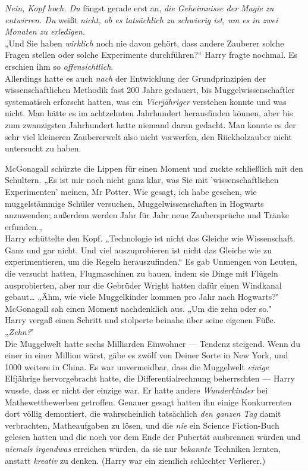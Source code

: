 {\emph{Nein, Kopf hoch. Du} fängst gerade erst an, \emph{die Geheimnisse der Magie zu entwirren. Du} weißt \emph{nicht, ob es tatsächlich zu schwierig ist, um es in zwei Monaten zu erledigen.}\\ „Und Sie haben \emph{wirklich} noch nie davon gehört, dass andere Zauberer solche Fragen stellen oder solche Experimente durchführen?“ Harry fragte nochmal. Es erschien ihm so \emph{offensichtlich}.\\ Allerdings hatte es auch \emph{nach} der Entwicklung der Grundprinzipien der wissenschaftlichen Methodik fast 200 Jahre gedauert, bis Muggelwissenschaftler systematisch erforscht hatten, was ein \emph{Vierjähriger} verstehen konnte und was nicht. Man hätte es im achtzehnten Jahrhundert herausfinden können, aber bis zum zwanzigsten Jahrhundert hatte niemand daran gedacht. Man konnte es der sehr viel kleineren Zaubererwelt also nicht vorwerfen, den Rückholzauber nicht untersucht zu haben.

McGonagall schürzte die Lippen für einen Moment und zuckte schließlich mit den Schultern. „Es ist mir noch nicht ganz klar, was Sie mit 'wissenschaftlichen Experimenten' meinen, Mr Potter. Wie gesagt, ich habe gesehen, wie muggelstämmige Schüler versuchen, Muggelwissenschaften in Hogwarts anzuwenden; außerdem werden Jahr für Jahr neue Zaubersprüche und Tränke erfunden.„\\ Harry schüttelte den Kopf. „Technologie ist nicht das Gleiche wie Wissenschaft. Ganz und gar nicht. Und viel auszuprobieren ist nicht das Gleiche wie zu experimentieren, um die Regeln herauszufinden.“ Es gab Unmengen von Leuten, die versucht hatten, Flugmaschinen zu bauen, indem sie Dinge mit Flügeln ausprobierten, aber nur die Gebrüder Wright hatten dafür einen Windkanal gebaut… „Ähm, wie viele Muggelkinder kommen pro Jahr nach Hogwarts?"\\ McGonagall sah einen Moment nachdenklich aus. „Um die zehn oder so."\\ Harry vergaß einen Schritt und stolperte beinahe über seine eigenen Füße. „\emph{Zehn?}"\\ Die Muggelwelt hatte sechs Milliarden Einwohner --- Tendenz steigend. Wenn du einer in einer Million wärst, gäbe es zwölf von Deiner Sorte in New York, und 1000 weitere in China. Es war unvermeidbar, dass die Muggelwelt \emph{einige} Elfjährige hervorgebracht hatte, die Differentialrechnung beherrschten --- Harry wusste, dass er nicht der einzige war. Er hatte andere \emph{Wunderkinder} bei Mathewettbewerben getroffen. Genauer gesagt hatten ihn einige Konkurrenten dort völlig demontiert, die wahrscheinlich tatsächlich \emph{den ganzen Tag} damit verbrachten, Matheaufgaben zu lösen, und die \emph{nie} ein Science Fiction-Buch gelesen hatten und die noch vor dem Ende der Pubertät ausbrennen würden und \emph{niemals irgendwas} erreichen würden, da sie nur \emph{bekannte} Techniken lernten, anstatt \emph{kreativ} zu denken. (Harry war ein ziemlich schlechter Verlierer.)

}
